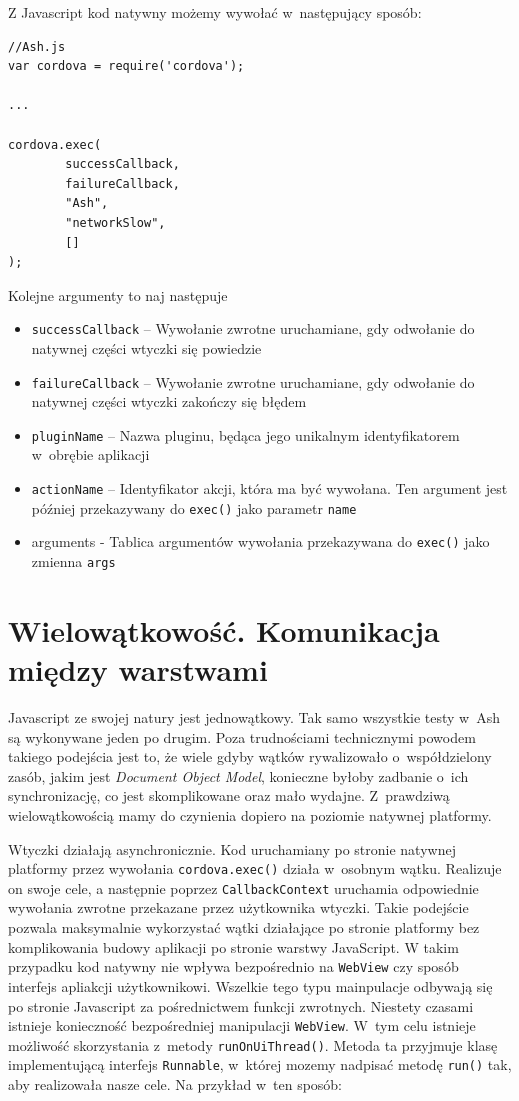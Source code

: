 \documentclass[brudnopis]{xmgr}
\begin{document}
Z Javascript kod natywny możemy wywołać w~następujący sposób:

\begin{lstlisting}
//Ash.js
var cordova = require('cordova');

...

cordova.exec( 
        successCallback,
        failureCallback, 
        "Ash", 
        "networkSlow", 
        []
);
\end{lstlisting}

Kolejne argumenty to naj następuje
\begin{itemize}
  \item \texttt{successCallback} -- Wywołanie zwrotne uruchamiane, gdy odwołanie do natywnej części wtyczki się powiedzie
  \item \texttt{failureCallback} -- Wywołanie zwrotne uruchamiane, gdy odwołanie do natywnej części wtyczki zakończy się błędem
  \item \texttt{pluginName} -- Nazwa pluginu, będąca jego unikalnym identyfikatorem w~obrębie aplikacji
  \item \texttt{actionName} -- Identyfikator akcji, która ma być wywołana. Ten argument jest później przekazywany do \texttt{exec()} jako parametr \texttt{name} 
\item arguments - Tablica argumentów wywołania przekazywana do \texttt{exec()} jako zmienna \texttt{args} 
\end{itemize}

\section{Wielowątkowość. Komunikacja między warstwami}

Javascript ze swojej natury jest jednowątkowy. Tak samo wszystkie testy w~Ash są wykonywane jeden po drugim. Poza trudnościami technicznymi powodem takiego podejścia jest to, że wiele gdyby wątków rywalizowało o~współdzielony zasób, jakim jest \textit{Document Object Model}, konieczne byłoby zadbanie o~ich synchronizację, co jest skomplikowane oraz mało wydajne. Z~prawdziwą wielowątkowością mamy do czynienia dopiero na poziomie natywnej platformy.

Wtyczki działają asynchronicznie. Kod uruchamiany po stronie natywnej platformy przez wywołania \texttt{cordova.exec()} działa w~osobnym wątku. Realizuje on swoje cele, a następnie poprzez \texttt{CallbackContext} uruchamia odpowiednie wywołania zwrotne przekazane przez użytkownika wtyczki. Takie podejście pozwala maksymalnie wykorzystać wątki działające po stronie platformy bez komplikowania budowy aplikacji po stronie warstwy JavaScript. W takim przypadku kod natywny nie wpływa bezpośrednio na \texttt{WebView} czy sposób interfejs apliakcji użytkownikowi. Wszelkie tego typu mainpulacje odbywają się po stronie Javascript za pośrednictwem funkcji zwrotnych. Niestety czasami istnieje konieczność bezpośredniej manipulacji \texttt{WebView}. W~tym celu istnieje możliwość skorzystania z~metody \texttt{runOnUiThread()}. Metoda ta przyjmuje klasę implementującą interfejs \texttt{Runnable}, w~której mozemy nadpisać metodę \texttt{run()} tak, aby realizowała nasze cele. Na przykład w~ten sposób:
\end{document}

